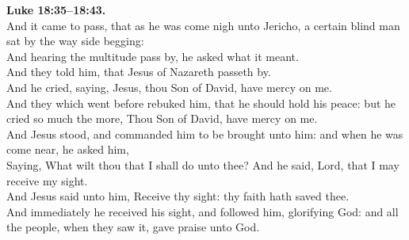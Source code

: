 \documentclass[12pt]{article} %
\begin{document}
{\begin{minipage}[t]{0.45\textwidth}
\textbf{Luke 18:35--18:43.}\\
And it came to pass, that as he was come nigh unto Jericho, a certain blind man sat by the way side begging:\\
And hearing the multitude pass by, he asked what it meant.\\
And they told him, that Jesus of Nazareth passeth by.\\
And he cried, saying, Jesus, thou Son of David, have mercy on me.\\
And they which went before rebuked him, that he should hold his peace: but he cried so much the more, Thou Son of David, have mercy on me.\\
And Jesus stood, and commanded him to be brought unto him: and when he was come near, he asked him,\\
Saying, What wilt thou that I shall do unto thee? And he said, Lord, that I may receive my sight.\\
And Jesus said unto him, Receive thy sight: thy faith hath saved thee.\\
And immediately he received his sight, and followed him, glorifying God: and all the people, when they saw it, gave praise unto God.\\

\end{minipage}}
\vspace*{\fill}
\newpage
\huge%
\vspace*{\fill}
\begin{spacing}{1.3}
\end{spacing}
\vspace*{\fill}
\end{document}
